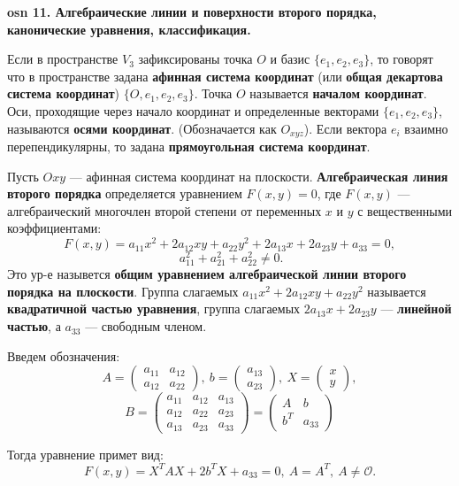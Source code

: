 \textbf{\LARGE osn 11. Алгебраические линии и поверхности второго порядка, канонические уравнения,  классификация.}

Если в пространстве $V_3$ зафиксированы точка $O$ и базис $\{e_1, e_2, e_3\}$, то говорят что в пространстве задана \textbf{афинная система координат} (или \textbf{общая декартова система координат}) $\{O, e_1, e_2, e_3\}$. Точка $O$ называется \textbf{началом координат}. Оси, проходящие через начало координат и определенные векторами $\{e_1, e_2, e_3\}$, называются \textbf{осями координат}. (Обозначается как $O_{xyz}$). Если вектора $e_i$ взаимно перепендикулярны, то задана \textbf{прямоугольная система координат}.

\bigbreak

Пусть $Oxy$ --- афинная система координат на плоскости. \textbf{Алгебраическая линия второго порядка} определяется уравнением $F(x, y) = 0$, где $F(x, y)$ --- алгебраический многочлен второй степени от переменных $x$ и $y$ с вещественными коэффициентами:
$$F(x,y)=a_{11}x^2 +2a_{12}xy+a_{22}y^2 +2a_{13}x+2a_{23}y+a_{33} =0,$$
$$~a_{11}^2 + a_{21}^2 + a_{22}^2\neq 0.$$
Это ур-е назывется \textbf{общим уравнением алгебраической линии второго порядка на плоскости}. Группа слагаемых $a_{11}x^2 + 2a_{12}xy + a_{22}y^2$ называется \textbf{квадратичной частью уравнения}, группа слагаемых $2a_{13}x + 2a_{23}y$ --- \textbf{линейной частью}, а $a_{33}$ --- свободным членом.

Введем обозначения:
$$A = \begin{pmatrix} a_{11} & a_{12} \\a_{12} & a_{22}\end{pmatrix},~ b=\begin{pmatrix} a_{13} \\ a_{23} \end{pmatrix},~ X=\begin{pmatrix}x \\ y\end{pmatrix},$$
$$B = \begin{pmatrix} a_{11} & a_{12} & a_{13} \\a_{12} & a_{22} & a_{23} \\ a_{13} & a_{23} & a_{33}\end{pmatrix} = \begin{pmatrix} A & b \\ b^T & a_{33}\end{pmatrix}$$

Тогда уравнение примет вид:
$$F(x,y) = X^TAX+2b^TX+a_{33}=0,~A=A^T,~A\neq\mathcal{O}.$$

